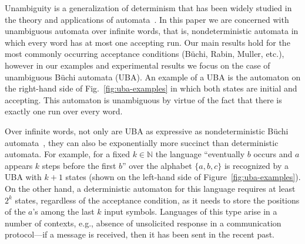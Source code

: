 \documentclass{elsarticle}
\begin{document}
Unambiguity is a generalization of determinism that has been widely
studied in the theory and applications of
automata~\cite{Colcombet12,Colcombet15}.  In this paper we are
concerned with unambiguous automata over infinite words, that is,
nondeterministic automata in which every word has at most one
accepting run.  Our main results hold for the most commonly occurring
acceptance conditions (B\"{u}chi, Rabin, Muller, etc.), however in our
examples and experimental results we focus on the case of unambiguous
B\"{u}chi automata (UBA).  An example of a UBA is the automaton on the
right-hand side of Fig.~\ref{fig:uba-examples} in which both states
are initial and accepting.  This automaton is unambiguous by virtue of
the fact that there is exactly one run over every word.


Over infinite words, not only are UBA as expressive as
nondeterministic B\"uchi automata~\cite{Arnold85}, they can also be
exponentially more succinct than deterministic automata.  For example,
for a fixed $k\in \mathbb{N}$
the language ``eventually $b$ occurs and $a$ appears $k$ steps before
the first $b$'' over the alphabet $\{a,b,c\}$ is recognized by a UBA
with $k{+}1$ states (shown on the left-hand side of
Figure~\ref{fig:uba-examples}).  On the other hand, a deterministic
automaton for this language requires at least $2^k$ states, regardless
of the acceptance condition, as it needs to store the positions of the
$a$'s among the last $k$ input symbols.  Languages of this type arise
in a number of contexts, e.g., absence of unsolicited response in a
communication protocol---if a message is received, then it has been
sent in the recent past.
\end{document}
